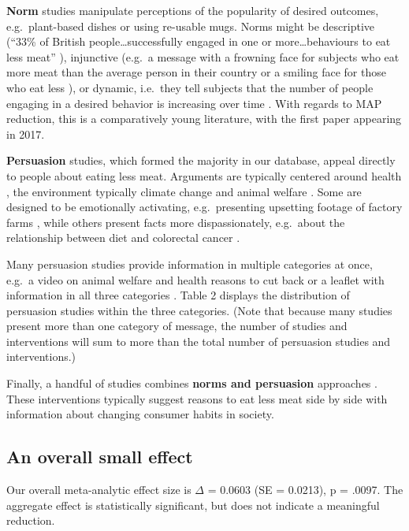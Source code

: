 \documentclass[sn-nature,pdflatex]{sn-jnl}
\begin{document}
\textbf{Norm} studies manipulate perceptions of the popularity of
desired outcomes, e.g.~plant-based dishes \citep{sparkman2021} or using
re-usable mugs\citep{loschelder2019}. Norms might be descriptive (``33\%
of British people\ldots successfully engaged in one or
more\ldots behaviours to eat less meat'' \citep{aldoh2023}), injunctive
(e.g.~a message with a frowning face for subjects who eat more meat than
the average person in their country or a smiling face for those who eat
less \citep{alblas2023}), or dynamic, i.e.~they tell subjects that the
number of people engaging in a desired behavior is increasing over time
\citep{aldoh2023, coker2022, sparkman2017, sparkman2020, sparkman2021}.
With regards to MAP reduction, this is a comparatively young literature,
with the first paper appearing in 2017.

\textbf{Persuasion} studies, which formed the majority in our database,
appeal directly to people about eating less meat. Arguments are
typically centered around health \citep{lacroix2020}, the environment
\citep{carfora2023} \textemdash typically climate change \textemdash and
animal welfare \citep{haile2021}. Some are designed to be emotionally
activating, e.g.~presenting upsetting footage of factory farms
\citep{bertolaso2015}, while others present facts more dispassionately,
e.g.~about the relationship between diet and colorectal cancer
\citep{hatami2018}.

Many persuasion studies provide information in multiple categories at
once, e.g.~a video on animal welfare and health reasons to cut back
\citep{feltz2022} or a leaflet with information in all three categories
\citep{hennessy2016}. Table 2 displays the distribution of persuasion
studies within the three categories. (Note that because many studies
present more than one category of message, the number of studies and
interventions will sum to more than the total number of persuasion
studies and interventions.)

Finally, a handful of studies combines \textbf{norms and persuasion}
approaches
\citep{hennessy2016, carfora2023, lacroix2020, mattson2020, piester2020}.
These interventions typically suggest reasons to eat less meat side by
side with information about changing consumer habits in society.

\subsection{An overall small effect}\label{sec2.2}

Our overall meta-analytic effect size is \(\Delta\) = 0.0603 (SE =
0.0213), p = .0097. The aggregate effect is statistically significant,
but does not indicate a meaningful reduction.
\end{document}
